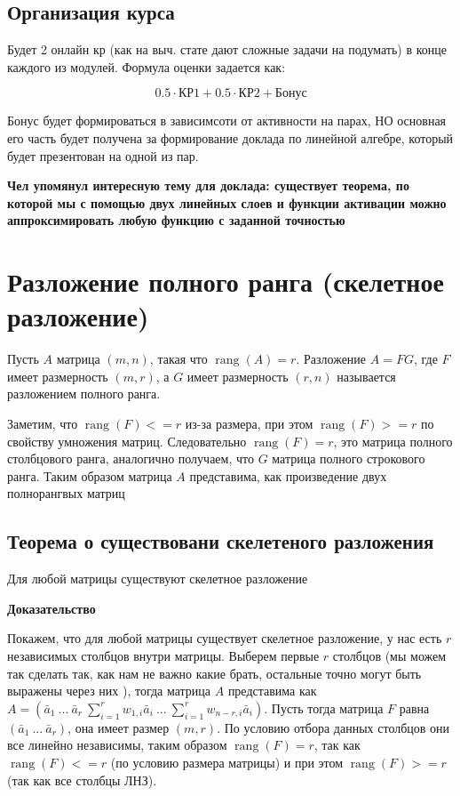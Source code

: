 \documentclass{article}
\begin{document}
    \subsection{Организация курса}

    Будет 2 онлайн кр (как на выч. стате дают сложные задачи на подумать) в конце каждого из модулей. 
    Формула оценки задается как: 
    
    \begin{equation}
       0.5 \cdot \text{КР1} + 0.5 \cdot \text{КР2} + \text{Бонус}
    \end{equation}

    Бонус будет формироваться в зависимсоти от активности на парах, НО основная его часть будет получена за формирование доклада по линейной алгебре, который будет презентован на одной из пар.

    \textbf{Чел упомянул интересную тему для доклада: существует теорема, по которой мы с помощью двух линейных слоев и функции активации можно аппроксимировать любую функцию с заданной точностью}


    \section{Разложение полного ранга (скелетное разложение)}

    Пусть $A$ матрица $(m, n)$, такая что $\operatorname{rang}(A) = r$.
    Разложение $A = FG$, где $F$ имеет размерность $(m, r)$, а $G$ имеет размерность $(r, n)$ называется
    разложением полного ранга.

    Заметим, что $\operatorname{rang}(F) <= r$ из-за размера, при этом $\operatorname{rang}(F) >= r$ по свойству умножения матриц.
    Следовательно $\operatorname{rang}(F) = r$, это матрица полного столбцового ранга, аналогично получаем, что $G$ матрица полного строкового ранга.
    Таким образом матрица $A$ представима, как произведение двух полнорангвых матриц

    \subsection{Теорема о существовани скелетеного разложения}

    Для любой матрицы существуют скелетное разложение

    \quad

    \textbf{Доказательство}

    \quad

    Покажем, что для любой матрицы существует скелетное разложение,
    у нас есть $r$ независимых столбцов внутри матрицы.
    Выберем первые $r$ столбцов (мы можем так сделать так, как нам не важно какие брать, остальные точно могут быть выражены через них ),
    тогда матрица $A$ представима как
    $A = (\bar{a}_{1} \ ... \ \bar{a}_{r} \ \sum^{r}_{i = 1}{w_{1, i}  \bar{a}_{i}} \ ... \  \sum^{r}_{i = 1}{w_{n - r, i} \bar{a}_{i}})$.
    Пусть тогда матрица $F$ равна $(\bar{a}_{1} \ ... \ \bar{a}_{r})$, она имеет размер $(m, r)$.
    По условию отбора данных столбцов они все линейно независимы, таким образом $\operatorname{rang}(F) = r$, так как
    $\operatorname{rang}(F) <= r$ (по условию размера матрицы) и при этом $\operatorname{rang}(F) >= r$ (так как все столбцы ЛНЗ).
\end{document}
